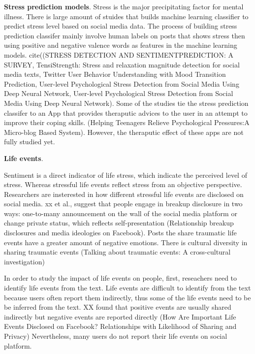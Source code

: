 \textbf{Stress prediction models}. Stress is the major precipitating factor for mental illness. There is large amount of stuides that builds machine learning classifier to predict stress level based on social media data. The process of building stress prediction classifer mainly involve human labels on posts that shows stress then using positive and negative valence words as features in the machine learning models. cite((STRESS DETECTION AND SENTIMENTPREDICTION: A SURVEY, TensiStrength: Stress and relaxation magnitude detection for social media texts, Twitter User Behavior Understanding with Mood Transition Prediction, User-level Psychological Stress Detection from Social Media Using Deep Neural Network, User-level Psychological Stress Detection from Social Media Using Deep Neural Network). Some of the studies tie the stress prediction classifer to an App that provides theraputic advices to the user in an attempt to improve their coping skills. (Helping Teenagers Relieve Psychological Pressures:A Micro-blog Based System). However, the theraputic effect of these apps are not fully studied yet.

\textbf{Life events}. 

Sentiment is a direct indicator of life stress, which indicate the perceived level of stress. Whereas stressful life events reflect stress from an objective perspective. Researchers are insterested in how different stressful life events are disclosed on social media. xx et al., suggest that people engage in breakup disclosure in two ways: one-to-many announcement on the wall of the social media platform or change private status, which reflects self-presentation (Relationship breakup disclosures and media ideologies on Facebook). Posts the share traumatic life events have a greater amount of negative emotions. There is cultural diversity in sharing traumatic events (Talking about traumatic events: A cross-cultural investigation)
 
 In order to study the impact of life events on people, first, reseachers need to identify life events from the text. Life events are difficult to identify from the text because users often report them indirectly, thus some of the life events need to be be inferred from the text. XX found that positive events are usually shared indirectly but negative events are reported directly (How Are Important Life Events Disclosed on Facebook? Relationships with Likelihood of Sharing and Privacy) Nevertheless, many users do not report their life events on social platform. 

